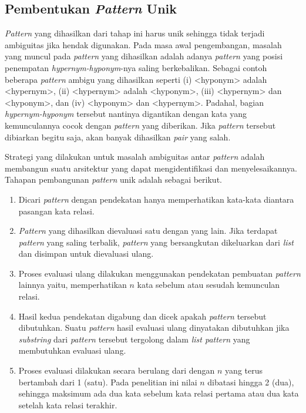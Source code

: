 \subsection{Pembentukan \textit{Pattern} Unik}
\textit{Pattern} yang dihasilkan dari tahap ini harus unik sehingga tidak terjadi ambiguitas jika hendak digunakan. Pada masa awal pengembangan, masalah yang muncul pada \textit{pattern} yang dihasilkan adalah adanya \textit{pattern} yang posisi penempatan \textit{hypernym-hyponym}-nya saling berkebalikan. Sebagai contoh beberapa \textit{pattern} ambigu yang dihasilkan seperti (i) <hyponym> adalah <hypernym>, (ii) <hypernym> adalah <hyponym>, (iii) <hypernym> dan <hyponym>, dan (iv) <hyponym> dan <hypernym>. Padahal, bagian \textit{hypernym-hyponym} tersebut nantinya digantikan dengan kata yang kemunculannya cocok dengan \textit{pattern} yang diberikan. Jika \textit{pattern} tersebut dibiarkan begitu saja, akan banyak dihasilkan \textit{pair} yang salah.

Strategi yang dilakukan untuk masalah ambiguitas antar \textit{pattern} adalah membangun suatu arsitektur yang dapat mengidentifikasi dan menyelesaikannya. Tahapan pembangunan \textit{pattern} unik adalah sebagai berikut.
\begin{enumerate}
  \item Dicari \textit{pattern} dengan pendekatan hanya memperhatikan kata-kata diantara pasangan kata relasi.
  \item \textit{Pattern} yang dihasilkan dievaluasi satu dengan yang lain. Jika terdapat \textit{pattern} yang saling terbalik, \textit{pattern} yang bersangkutan dikeluarkan dari \textit{list} dan disimpan untuk dievaluasi ulang.
  \item Proses evaluasi ulang dilakukan menggunakan pendekatan pembuatan \textit{pattern} lainnya yaitu, memperhatikan $n$ kata sebelum atau sesudah kemunculan relasi.
  \item Hasil kedua pendekatan digabung dan dicek apakah \textit{pattern} tersebut dibutuhkan. Suatu \textit{pattern} hasil evaluasi ulang dinyatakan dibutuhkan jika \textit{substring} dari \textit{pattern} tersebut tergolong dalam \textit{list pattern} yang membutuhkan evaluasi ulang.
  \item Proses evaluasi dilakukan secara berulang dari dengan $n$ yang terus bertambah dari 1 (satu). Pada penelitian ini nilai $n$ dibatasi hingga 2 (dua), sehingga maksimum ada dua kata sebelum kata relasi pertama atau dua kata setelah kata relasi terakhir.
\end{enumerate}

